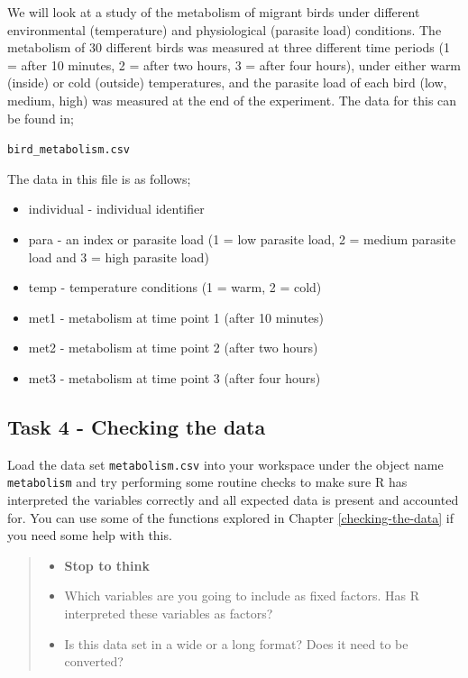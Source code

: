 \documentclass[
]{book}
\providecommand{\tightlist}{%
  \setlength{\itemsep}{0pt}\setlength{\parskip}{0pt}}
\begin{document}
We will look at a study of the metabolism of migrant birds under different environmental (temperature) and physiological (parasite load) conditions. The metabolism of 30 different birds was measured at three different time periods (1 = after 10 minutes, 2 = after two hours, 3 = after four hours), under either warm (inside) or cold (outside) temperatures, and the parasite load of each bird (low, medium, high) was measured at the end of the experiment. The data for this can be found in;

\texttt{bird\_metabolism.csv}

The data in this file is as follows;

\begin{itemize}
\tightlist
\item
  individual - individual identifier
\item
  para - an index or parasite load (1 = low parasite load, 2 = medium parasite load and 3 = high parasite load)
\item
  temp - temperature conditions (1 = warm, 2 = cold)
\item
  met1 - metabolism at time point 1 (after 10 minutes)
\item
  met2 - metabolism at time point 2 (after two hours)
\item
  met3 - metabolism at time point 3 (after four hours)
\end{itemize}

\subsection{Task 4 - Checking the data}\label{task-4---checking-the-data}

Load the data set \texttt{metabolism.csv} into your workspace under the object name \texttt{metabolism} and try performing some routine checks to make sure R has interpreted the variables correctly and all expected data is present and accounted for. You can use some of the functions explored in Chapter \ref{checking-the-data} if you need some help with this.

\begin{quote}
\begin{itemize}
\tightlist
\item
  \textbf{Stop to think}
\item
  Which variables are you going to include as fixed factors. Has R interpreted these variables as factors?
\item
  Is this data set in a wide or a long format? Does it need to be converted?
\end{itemize}
\end{quote}
\end{document}
